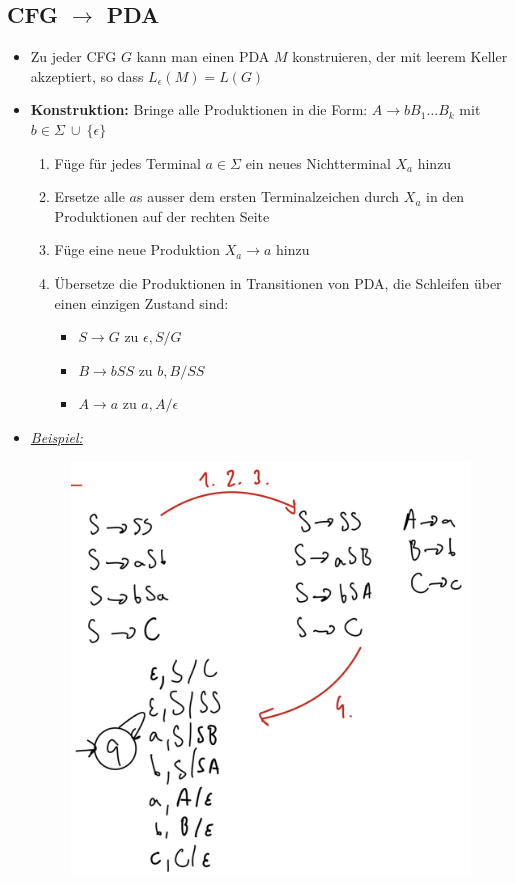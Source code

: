 \documentclass[ieeetran]{article}
\begin{document}
\subsection{CFG $\rightarrow$ PDA} %
\label{sub:_cFG_rightarrow_pDA}
\begin{itemize}
	\item Zu jeder CFG $G$ kann man einen PDA $M$ konstruieren, der mit leerem Keller akzeptiert, so dass $L_{\epsilon}(M) = L(G)$
\item \textbf{Konstruktion:} Bringe alle Produktionen in die Form: $A \rightarrow bB_1 \ldots B_k$ mit $b \in \Sigma \ \cup \ \{\epsilon\}$
	\begin{enumerate}
	\item Füge für jedes Terminal $a\in\Sigma$ ein neues Nichtterminal $X_a$ hinzu
	\item Ersetze alle $a$s ausser dem ersten Terminalzeichen durch $X_a$ in den Produktionen auf der rechten Seite
	\item Füge eine neue Produktion $X_a \rightarrow a$ hinzu
	\item Übersetze die Produktionen in Transitionen von PDA, die Schleifen über einen einzigen Zustand sind:
		\begin{itemize}
			\item $S \rightarrow G$ zu $\epsilon, S / G$
			\item $B \rightarrow bSS$ zu $b, B/SS$
			\item $A \rightarrow a$ zu $a, A/\epsilon$

		\end{itemize}
	\end{enumerate}

\item \textit{\underline{Beispiel:}}
	\begin{figure}[h!]
	  \centering
	  \includegraphics[width=0.5\linewidth]{cfgtopda}
	  \label{fig:cfgtopda}
	\end{figure}
\end{itemize}
\end{document}
